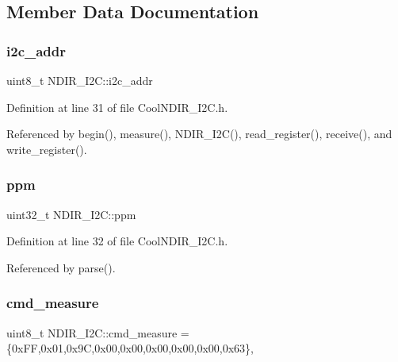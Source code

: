 \subsection{Member Data Documentation}
\mbox{\label{class_n_d_i_r___i2_c_aac12069dd5a86a9ec6aa31ac9a44aabe}} 
\subsubsection{\texorpdfstring{i2c\+\_\+addr}{i2c\_addr}}
{\footnotesize\ttfamily uint8\+\_\+t N\+D\+I\+R\+\_\+\+I2\+C\+::i2c\+\_\+addr}



Definition at line 31 of file Cool\+N\+D\+I\+R\+\_\+\+I2\+C.\+h.



Referenced by begin(), measure(), N\+D\+I\+R\+\_\+\+I2\+C(), read\+\_\+register(), receive(), and write\+\_\+register().

\mbox{\label{class_n_d_i_r___i2_c_a7e5cfc725dba0f9c2bd1bd5ab3bb8600}} 
\subsubsection{\texorpdfstring{ppm}{ppm}}
{\footnotesize\ttfamily uint32\+\_\+t N\+D\+I\+R\+\_\+\+I2\+C\+::ppm}



Definition at line 32 of file Cool\+N\+D\+I\+R\+\_\+\+I2\+C.\+h.



Referenced by parse().

\mbox{\label{class_n_d_i_r___i2_c_af47e04052a5fb25c79e7142b673aae28}} 
\subsubsection{\texorpdfstring{cmd\+\_\+measure}{cmd\_measure}}
{\footnotesize\ttfamily uint8\+\_\+t N\+D\+I\+R\+\_\+\+I2\+C\+::cmd\+\_\+measure = \{0x\+F\+F,0x01,0x9\+C,0x00,0x00,0x00,0x00,0x00,0x63\}\hspace{0.3cm}{\ttfamily [static]}, {\ttfamily [private]}}




